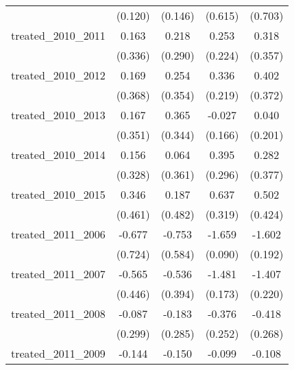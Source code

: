 {\begin{tabular}{l*{4}{c}}
            &     (0.120)         &     (0.146)         &     (0.615)         &     (0.703)         \\
[1em]
treated\_2010\_2011&       0.163         &       0.218         &       0.253         &       0.318         \\
            &     (0.336)         &     (0.290)         &     (0.224)         &     (0.357)         \\
[1em]
treated\_2010\_2012&       0.169         &       0.254         &       0.336         &       0.402         \\
            &     (0.368)         &     (0.354)         &     (0.219)         &     (0.372)         \\
[1em]
treated\_2010\_2013&       0.167         &       0.365         &      -0.027         &       0.040         \\
            &     (0.351)         &     (0.344)         &     (0.166)         &     (0.201)         \\
[1em]
treated\_2010\_2014&       0.156         &       0.064         &       0.395         &       0.282         \\
            &     (0.328)         &     (0.361)         &     (0.296)         &     (0.377)         \\
[1em]
treated\_2010\_2015&       0.346         &       0.187         &       0.637\sym{*}  &       0.502         \\
            &     (0.461)         &     (0.482)         &     (0.319)         &     (0.424)         \\
[1em]
treated\_2011\_2006&      -0.677         &      -0.753         &      -1.659\sym{***}&      -1.602\sym{***}\\
            &     (0.724)         &     (0.584)         &     (0.090)         &     (0.192)         \\
[1em]
treated\_2011\_2007&      -0.565         &      -0.536         &      -1.481\sym{***}&      -1.407\sym{***}\\
            &     (0.446)         &     (0.394)         &     (0.173)         &     (0.220)         \\
[1em]
treated\_2011\_2008&      -0.087         &      -0.183         &      -0.376         &      -0.418         \\
            &     (0.299)         &     (0.285)         &     (0.252)         &     (0.268)         \\
[1em]
treated\_2011\_2009&      -0.144         &      -0.150         &      -0.099         &      -0.108         \\

\end{tabular}}
